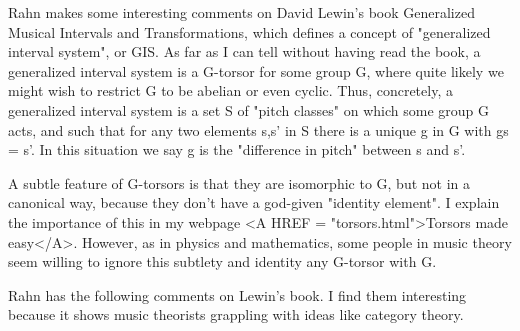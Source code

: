 Rahn makes some interesting comments on David Lewin's book
Generalized Musical Intervals and Transformations, which defines a
concept of "generalized interval system", or GIS.
As far as I can tell without having read the book, a generalized interval
system is a G-torsor for some group G, where quite likely we might wish to
restrict G to be abelian or even cyclic.  Thus, concretely, a
generalized interval system is a set S of "pitch classes"
on which some group G acts, and such that for any two elements s,s' in S
there is a unique g in G with gs = s'.  In this situation we say
g is the "difference in pitch" between s and s'.  

A subtle feature of G-torsors is that they are isomorphic to G,
but not in a canonical way, because they don't have a god-given
"identity element".  I explain the importance of this in
my webpage <A HREF = "torsors.html">Torsors made easy</A>.
However, as in physics and mathematics, some people in music
theory seem willing to ignore this subtlety and identity any
G-torsor with G.

Rahn has the following comments on Lewin's book.  I find
them interesting because it shows music theorists grappling with
ideas like category theory.

